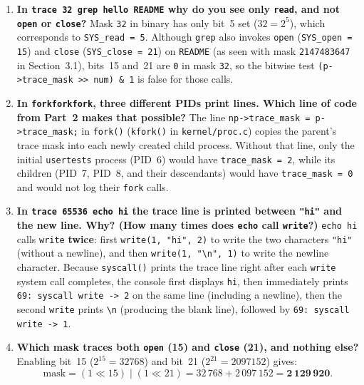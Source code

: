\documentclass{../latex/utmreport}
\providecommand{\tightlist}{\setlength{\itemsep}{0pt}\setlength{\parskip}{0pt}}
\begin{document}
\begin{enumerate}
\tightlist
\item \textbf{In \texttt{trace 32 grep hello README} why do you see only \texttt{read}, and not \texttt{open} or \texttt{close}?}
Mask \texttt{32} in binary has only bit~5 set ($32 = 2^5$), which corresponds to \texttt{SYS\_read = 5}. Although \texttt{grep} also invokes \texttt{open} (\texttt{SYS\_open = 15}) and \texttt{close} (\texttt{SYS\_close = 21}) on \texttt{README} (as seen with mask \texttt{2147483647} in Section~3.1), bits~15 and~21 are \texttt{0} in mask \texttt{32}, so the bitwise test \texttt{(p->trace\_mask >> num) \& 1} is false for those calls.

\item \textbf{In \texttt{forkforkfork}, three different PIDs print lines. Which line of code from Part~2 makes that possible?}
The line \texttt{np->trace\_mask = p->trace\_mask;} in \texttt{fork()} (\texttt{kfork()} in \texttt{kernel/proc.c}) copies the parent's trace mask into each newly created child process. Without that line, only the initial \texttt{usertests} process (PID~6) would have \texttt{trace\_mask = 2}, while its children (PID~7, PID~8, and their descendants) would have \texttt{trace\_mask = 0} and would not log their \texttt{fork} calls.

\item \textbf{In \texttt{trace 65536 echo hi} the trace line is printed between \texttt{"hi"} and the new line. Why? (How many times does \texttt{echo} call \texttt{write}?)}
\texttt{echo hi} calls \texttt{write} \textbf{twice}: first \texttt{write(1, "hi", 2)} to write the two characters \texttt{"hi"} (without a newline), and then \texttt{write(1, "\textbackslash n", 1)} to write the newline character. Because \texttt{syscall()} prints the trace line right after each \texttt{write} system call completes, the console first displays \texttt{hi}, then immediately prints \texttt{69: syscall write -> 2} on the same line (including a newline), then the second \texttt{write} prints \texttt{\textbackslash n} (producing the blank line), followed by \texttt{69: syscall write -> 1}.

\item \textbf{Which mask traces both \texttt{open} (15) and \texttt{close} (21), and nothing else?}
Enabling bit~15 ($2^{15} = 32768$) and bit~21 ($2^{21} = 2097152$) gives:
\[
\text{mask} = (1 \ll 15) \mid (1 \ll 21) = 32\,768 + 2\,097\,152 = \mathbf{2\,129\,920}.
\]
\end{enumerate}
\end{document}
